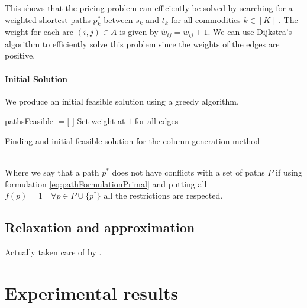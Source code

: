 \documentclass[14pt,a4paper]{article}
\theoremstyle{definition}
\numberwithin{equation}{subsection}
\begin{document}
This shows that the pricing problem can efficiently be solved by searching for a weighted shortest paths $p^*_k$ between $s_k$ and $t_k$ for all commodities $k \in [K]$ . The weight for each arc $(i,j)\in A$ is given by $\tilde{w}_{ij} = w_{ij}+1$. We can use Dijkstra's algorithm to efficiently solve this problem since the weights of the edges are positive.





\paragraph{Initial Solution}
We produce an initial feasible solution using a greedy algorithm.\\


\begin{algorithm}[H]
	\SetAlgoLined
	pathsFeasible $= [$  $]$\;
	Set weight at $1$ for all edges\;
	
	
	\caption{Finding and initial feasible solution for the column generation method}
\end{algorithm}

$ $\\

Where we say that a path $p^*$ does not have conflicts with a set of paths $P$ if using formulation \eqref{eq:pathFormulationPrimal} and putting all $f(p) = 1 \quad \forall p\in P \cup \{p^*\}$ all the restrictions are respected.



\subsection{Relaxation and approximation}
\label{relaxation}


Actually taken care of by \cite{gurobi}.




\newpage
\section{Experimental results}
\label{results}
\end{document}
